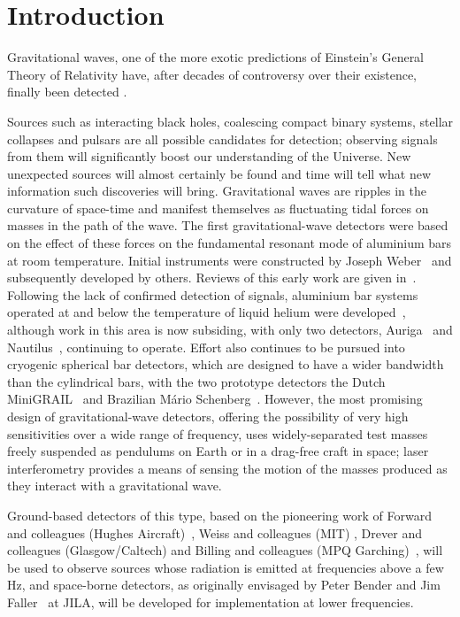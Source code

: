 \section{Introduction}
\label{section:introduction} 

Gravitational waves, one of the more exotic predictions of Einstein's General
Theory of Relativity have, after decades of controversy over their existence,
finally been detected \cite{GW150914}.


Sources such as interacting black holes, coalescing compact binary systems,
stellar collapses and pulsars are all possible candidates for detection;
observing signals from them will significantly boost our understanding of the
Universe. New unexpected sources will almost certainly be found and time will
tell what new information such discoveries will bring. Gravitational waves are
ripples in the curvature of space-time and manifest themselves as fluctuating
tidal forces on masses in the path of the wave. The first gravitational-wave
detectors were based on the effect of these forces on the fundamental resonant
mode of aluminium bars at room temperature. Initial instruments were constructed
by Joseph Weber~\cite{Weber1, Weber2} and subsequently developed by others.
Reviews of this early work are given in~\cite{Tyson, Douglass}. Following the
lack of confirmed detection of signals, aluminium bar systems operated at and
below the temperature of liquid helium were developed~\cite{Astone, Prodi,
Amaldi, Heng}, although work in this area is now subsiding, with only two
detectors, Auriga~\cite{AURIGA} and Nautilus~\cite{NAUTILUS}, continuing to
operate. Effort also continues to be pursued into cryogenic spherical bar
detectors, which are designed to have a wider bandwidth than the cylindrical
bars, with the two prototype detectors the Dutch MiniGRAIL~\cite{MiniGRAIL,
Gottardi:2007} and Brazilian M\'{a}rio Schenberg~\cite{Schenberg, Aguiar:2006}.
However, the most promising design of gravitational-wave detectors, offering the
possibility of very high sensitivities over a wide range of frequency, uses
widely-separated test masses freely suspended as pendulums on Earth or
in a drag-free craft in space; laser interferometry provides a means
of sensing the motion of the masses produced as they interact with a
gravitational wave.


Ground-based detectors of this type, based on the pioneering work of Forward
and colleagues (Hughes Aircraft)~\cite{Forward}, Weiss and colleagues (MIT)
\cite{Weiss}, Drever and colleagues (Glasgow/Caltech) \cite{Drever1,
Drever2} and Billing and colleagues (MPQ Garching)~\cite{Billing}, will be
used to observe sources whose radiation is emitted at frequencies above a few
Hz, and space-borne detectors, as originally envisaged by Peter Bender and Jim
Faller~\cite{BenderFaller1, BenderFaller2} at JILA, will be developed for
implementation at lower frequencies.


